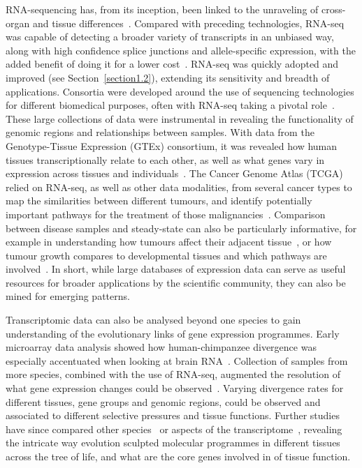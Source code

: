 RNA-sequencing has, from its inception, been linked to the unraveling of cross-organ and tissue differences~\citep{mortazavi_mapping_2008}. Compared with preceding technologies, RNA-seq was capable of detecting a broader variety of transcripts in an unbiased way, along with high confidence splice junctions and allele-specific expression, with the added benefit of doing it for a lower cost~\citep{wang_rna-seq:_2009}. RNA-seq was quickly adopted and improved (see Section~\ref{section1.2}), extending its sensitivity and breadth of applications. Consortia were developed around the use of sequencing technologies for different biomedical purposes, often with RNA-seq taking a pivotal role~\citep{the_cancer_genome_atlas_research_network_cancer_2013,the_encode_project_consortium_integrated_2012,lonsdale_genotype-tissue_2013}. These large collections of data were instrumental in revealing the functionality of genomic regions and relationships between samples. With data from the Genotype-Tissue Expression (GTEx) consortium, it was revealed how human tissues transcriptionally relate to each other, as well as what genes vary in expression across tissues and individuals~\citep{mele_human_2015}. The Cancer Genome Atlas (TCGA) relied on RNA-seq, as well as other data modalities, from several cancer types to map the similarities between different tumours, and identify potentially important pathways for the treatment of those malignancies~\citep{hoadley_cell--origin_2018}. Comparison between disease samples and steady-state can also be particularly informative, for example in understanding how tumours affect their adjacent tissue~\citep{aran_comprehensive_2017}, or how tumour growth compares to developmental tissues and which pathways are involved~\citep{young_single-cell_2018}. In short, while large databases of expression data can serve as useful resources for broader applications by the scientific community, they can also be mined for emerging patterns.

Transcriptomic data can also be analysed beyond one species to gain understanding of the evolutionary links of gene expression programmes. Early microarray data analysis showed how human-chimpanzee divergence was especially accentuated when looking at brain RNA~\citep{enard_intra-_2002}. Collection of samples from more species, combined with the use of RNA-seq, augmented the resolution of what gene expression changes could be observed~\citep{brawand_evolution_2011}. Varying divergence rates for different tissues, gene groups and genomic regions, could be observed and associated to different selective pressures and tissue functions. Further studies have since compared other species~\citep{li_comparison_2014} or aspects of the transcriptome~\citep{barbosa-morais_evolutionary_2012}, revealing the intricate way evolution sculpted molecular programmes in different tissues across the tree of life, and what are the core genes involved in of tissue function. 


